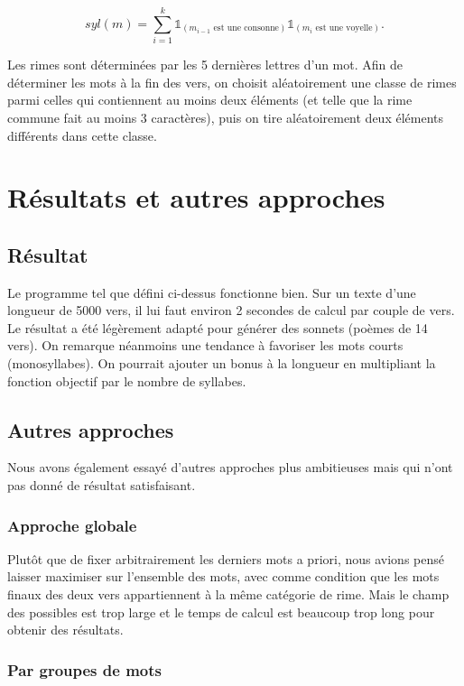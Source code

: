 \documentclass[a4paper,11pt]{article}
\begin{document}
\[ syl(m) = \sum_{i=1}^{k} \mathds{1}_{(m_{i-1} \text{ est une consonne})} \mathds{1}_{(m_{i} \text{ est une voyelle})}.\]


Les rimes sont déterminées par les 5 dernières lettres d'un mot. Afin de déterminer les mots à la fin des vers, on choisit aléatoirement une classe de rimes parmi celles qui contiennent au moins deux éléments (et telle que la rime commune fait au moins 3 caractères), puis on tire aléatoirement deux éléments différents dans cette classe. 

\section{Résultats et autres approches}

\subsection{Résultat}

Le programme tel que défini ci-dessus fonctionne bien. Sur un texte d'une longueur de 5000 vers, il lui faut environ 2 secondes de calcul par couple de vers. Le résultat a été légèrement adapté pour générer des sonnets (poèmes de 14 vers). On remarque néanmoins une tendance à favoriser les mots courts (monosyllabes). On pourrait ajouter un bonus à la longueur en multipliant la fonction objectif par le nombre de syllabes.

\subsection{Autres approches}

Nous avons également essayé d'autres approches plus ambitieuses mais qui n'ont pas donné de résultat satisfaisant.

\subsubsection{Approche globale}

Plutôt que de fixer arbitrairement les derniers mots a priori, nous avions pensé laisser maximiser sur l'ensemble des mots, avec comme condition que les mots finaux des deux vers appartiennent à la même catégorie de rime. Mais le champ des possibles est trop large et le temps de calcul est beaucoup trop long pour obtenir des résultats.

\subsubsection{Par groupes de mots}
\end{document}

